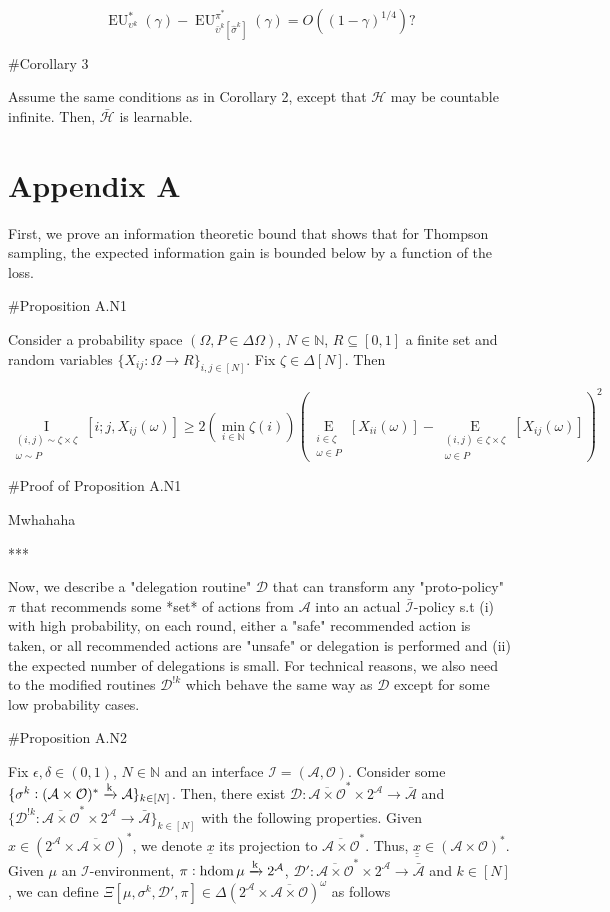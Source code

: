 \documentclass[a4paper]{article}
\newcommand{\EE}[2]{\underset{\substack{#1 \\ #2}}{\operatorname{E}}}
\newcommand{\II}[2]{\underset{\substack{#1 \\ #2}}{\operatorname{I}}}
\newcommand{\Nats}{\mathbb{N}}
\newcommand{\M}{\xrightarrow{\textnormal{k}}}
\newcommand{\Ob}{\mathcal{O}}
\newcommand{\A}{\mathcal{A}}
\newcommand{\In}{\mathcal{I}}
\newcommand{\FH}{(\A \times \Ob)^*}
\newcommand{\Ada}{\bar{\A}}
\newcommand{\Adi}{{\bar{\In}}}
\newcommand{\Adao}{\overline{\A \times \Ob}}
\newcommand{\Adfh}{\Adao^*}
\DeclareMathOperator{\HD}{hdom}
\newcommand{\Hy}{\mathcal{H}}
\newcommand{\EU}{\operatorname{EU}}
\newcommand{\D}{\mathcal{D}}
\begin{document}
$$\EU_{\upsilon^k}^*(\gamma) - \EU_{\bar{\upsilon}^k\left[\hat{\sigma}^k\right]}^{\pi^*}(\gamma) = O\left((1-\gamma)^{1/4}\right)?$$

\#Corollary 3

Assume the same conditions as in Corollary 2, except that $\Hy$ may be countable infinite. Then, $\bar{\Hy}$ is learnable.

\section{Appendix A}

First, we prove an information theoretic bound that shows that for Thompson sampling, the expected information gain is bounded below by a function of the loss.

\#Proposition A.N1

Consider a probability space $(\Omega, P \in \Delta\Omega)$, $N \in \Nats$, $R \subseteq [0,1]$ a finite set and random variables $\{X_{ij}: \Omega \rightarrow R\}_{i,j \in [N]}$. Fix $\zeta \in \Delta[N]$. Then

$$\II{(i,j)\sim\zeta\times\zeta}{\omega \sim P}\left[i;j,X_{ij}(\omega)\right] \geq 2 \left(\min_{i \in \Nats} {\zeta(i)}\right) \left(\EE{i \in \zeta}{\omega \in P}\left[X_{ii}(\omega)\right]-\EE{(i,j) \in \zeta \times \zeta}{\omega \in P}\left[X_{ij}(\omega)\right]\right)^2$$

\#Proof of Proposition A.N1

Mwhahaha

***

Now, we describe a "delegation routine" $\D$ that can transform any "proto-policy" $\pi$ that recommends some *set* of actions from $\A$ into an actual $\Adi$-policy s.t (i)  with high probability, on each round, either a "safe" recommended action is taken, or all recommended actions are "unsafe" or delegation is performed and (ii) the expected number of delegations is small. For technical reasons, we also need to the modified routines $\D^{!k}$ which behave the same way as $\D$ except for some low probability cases.

\#Proposition A.N2

Fix $\epsilon,\delta \in (0,1)$, $N \in \Nats$ and an interface $\In=(\A,\Ob)$. Consider some $\{\sigma^k: \FH \M \A\}_{k \in [N]}$. Then, there exist $\D: \Adfh \times 2^\A \rightarrow \Ada$ and $\{\D^{!k}: \Adfh \times 2^\A \rightarrow \Ada\}_{k \in [N]}$ with the following properties. Given $x \in \left(2^\A \times \Adao\right)^*$, we denote $\underline{x}$ its projection to $\Adfh$. Thus, $\underline{\underline{x}}\in\FH$.
Given  $\mu$ an $\In$-environment, $\pi: \HD{\mu} \M 2^\A$, $\D': \Adfh \times 2^\A \rightarrow \Ada$ and $k \in [N]$, we can define $\Xi\left[\mu,\sigma^k,\D',\pi\right]\in \Delta\left(2^\A \times \Adao\right)^\omega$ as follows
 
\end{document}
